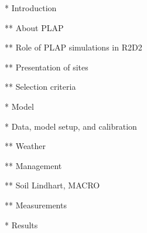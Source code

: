 \documentclass[a4paper]{article}
\begin{document}
\begin{text}
* Introduction

** About PLAP

** Role of PLAP simulations in R2D2

** Presentation of sites

** Selection criteria

* Model

* Data, model setup, and calibration

** Weather

** Management

** Soil Lindhart, MACRO

** Measurements

* Results

\end{text}






\end{document}
